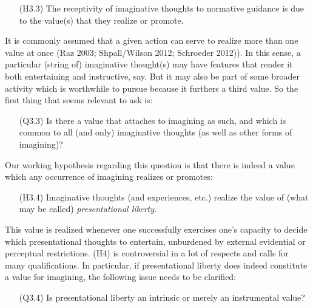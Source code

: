 \vspace{-.1cm}
\begin{itemize}[leftmargin=2cm]
\item[(H3.3)] The receptivity of imaginative thoughts to normative guidance is due to the value(s) that they realize or promote.
\end{itemize}
\vspace{-.1cm}

\noindent It is commonly assumed that a given action can serve to realize more than one value at once (Raz 2003; Shpall/Wilson 2012; Schroeder 2012)). In this sense, a particular (string of) imaginative thought(s) may have features that render it both entertaining and instructive, say. But it may also be part of some broader activity which is worthwhile to pursue because it furthers a third value. So the first thing that seems relevant to ask is:

\vspace{-.1cm}
\begin{itemize}[leftmargin=2cm]
\item[(Q3.3)] Is there a value that attaches to imagining as such, and which is common to all (and only) imaginative thoughts (as well as other forms of imagining)?
\end{itemize}
\vspace{-.1cm}

\noindent Our working hypothesis regarding this question is that there is indeed a value which any occurrence of imagining realizes or promotes:

\vspace{-.1cm}
\begin{itemize}[leftmargin=2cm]
\item[(H3.4)] Imaginative thoughts (and experiences, etc.) realize the value of (what may be called) \emph{presentational liberty}.
\end{itemize}
\vspace{-.1cm}

\noindent This value is realized whenever one successfully exercises one's capacity to decide which presentational thoughts to entertain, unburdened by external evidential or perceptual restrictions. (H4) is controversial in a lot of respects and calls for many qualifications. In particular, if presentational liberty does indeed constitute a value for imagining, the following issue needs to be clarified:

\vspace{-.1cm}
\begin{itemize}[leftmargin=2cm]
\item[(Q3.4)] Is presentational liberty an intrinsic or merely an instrumental value?
\end{itemize}
\vspace{-.1cm}

